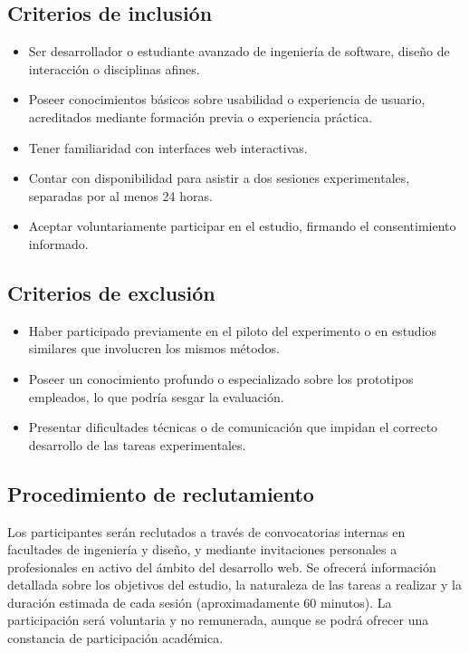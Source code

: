 \documentclass[a4paper,12pt]{report}
\begin{document}
\subsection*{Criterios de inclusión}
\begin{itemize}
    \item Ser desarrollador o estudiante avanzado de ingeniería de software, diseño de interacción o disciplinas afines.
    \item Poseer conocimientos básicos sobre usabilidad o experiencia de usuario, acreditados mediante formación previa o experiencia práctica.
    \item Tener familiaridad con interfaces web interactivas.
    \item Contar con disponibilidad para asistir a dos sesiones experimentales, separadas por al menos 24 horas.
    \item Aceptar voluntariamente participar en el estudio, firmando el consentimiento informado.
\end{itemize}

\subsection*{Criterios de exclusión}
\begin{itemize}
    \item Haber participado previamente en el piloto del experimento o en estudios similares que involucren los mismos métodos.
    \item Poseer un conocimiento profundo o especializado sobre los prototipos empleados, lo que podría sesgar la evaluación.
    \item Presentar dificultades técnicas o de comunicación que impidan el correcto desarrollo de las tareas experimentales.
\end{itemize}

\subsection*{Procedimiento de reclutamiento}
Los participantes serán reclutados a través de convocatorias internas en facultades de ingeniería y diseño, y mediante invitaciones personales a profesionales en activo del ámbito del desarrollo web. Se ofrecerá información detallada sobre los objetivos del estudio, la naturaleza de las tareas a realizar y la duración estimada de cada sesión (aproximadamente 60 minutos). La participación será voluntaria y no remunerada, aunque se podrá ofrecer una constancia de participación académica.
\end{document}
